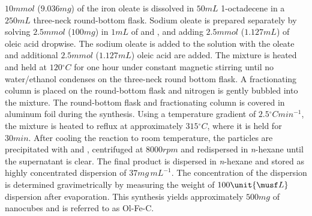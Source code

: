 \documentclass[\main/dresen_thesis.tex]{subfiles}
\begin{document}
    $10 \unit{mmol}$ ($9.036 \unit{mg}$) of the iron oleate is dissolved in $50 \unit{mL}$ 1-octadecene in a $250 \unit{mL}$ three-neck round-bottom flask.
    Sodium oleate is prepared separately by solving $2.5 \unit{mmol}$ ($100 \unit{mg}$)  in $1 \unit{mL}$ of  and , and adding $2.5 \unit{mmol}$ ($1.127 \unit{mL}$) of oleic acid dropwise.
    The sodium oleate is added to the solution with the oleate and additional $2.5 \unit{mmol}$ ($1.127 \unit{mL}$) oleic acid are added.
    The mixture is heated and held at $120 \unit{^\circ C}$ for one hour under constant magnetic stirring until no water/ethanol condenses on the three-neck round bottom flask.
    A fractionating column is placed on the round-bottom flask and nitrogen is gently bubbled into the mixture.
    The round-bottom flask and fractionating column is covered in aluminum foil during the synthesis.
    Using a temperature gradient of $2.5 \unit{^\circ C min^{-1}}$, the mixture is heated to reflux at approximately $315 \unit{^\circ C}$, where it is held for $30 \unit{min}$.
    After cooling the reaction to room temperature, the particles are precipitated with  and , centrifuged at $8000 \unit{rpm}$ and redispersed in \textit{n}-hexane until the supernatant is clear.
    The final product is dispersed in \textit{n}-hexane and stored as highly concentrated dispersion of $37 \unit{mg \, mL^{-1}}$.
    The concentration of the dispersion is determined gravimetrically by measuring the weight of $100 \unit{\musf L}$ dispersion after evaporation.
    This synthesis yields approximately $500 \unit{mg}$ of nanocubes and is referred to as Ol-Fe-C.
  

\end{document}
